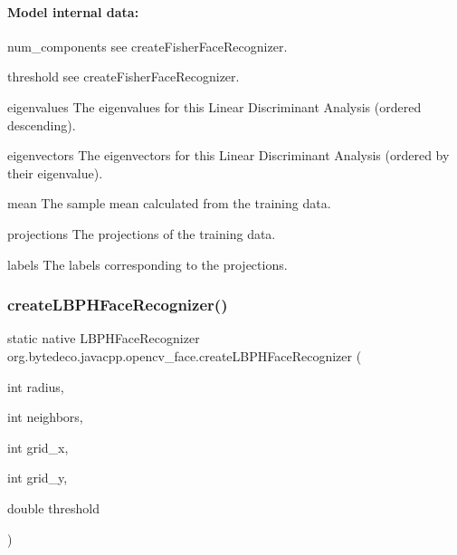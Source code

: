\paragraph*{Model internal data\+:}


\begin{DoxyItemize}
\item num\+\_\+components see create\+Fisher\+Face\+Recognizer.
\item threshold see create\+Fisher\+Face\+Recognizer.
\item eigenvalues The eigenvalues for this Linear Discriminant Analysis (ordered descending).
\item eigenvectors The eigenvectors for this Linear Discriminant Analysis (ordered by their eigenvalue).
\item mean The sample mean calculated from the training data.
\item projections The projections of the training data.
\item labels The labels corresponding to the projections. 
\end{DoxyItemize}\mbox{\label{group__face_ga970c161034e055fb56615aadba87ac4e}} 
\subsubsection{\texorpdfstring{create\+L\+B\+P\+H\+Face\+Recognizer()}{createLBPHFaceRecognizer()}}
{\footnotesize\ttfamily static native L\+B\+P\+H\+Face\+Recognizer org.\+bytedeco.\+javacpp.\+opencv\+\_\+face.\+create\+L\+B\+P\+H\+Face\+Recognizer (\begin{DoxyParamCaption}\item[{int}]{radius,  }\item[{int}]{neighbors,  }\item[{int}]{grid\+\_\+x,  }\item[{int}]{grid\+\_\+y,  }\item[{double}]{threshold }\end{DoxyParamCaption})\hspace{0.3cm}{\ttfamily [static]}}


